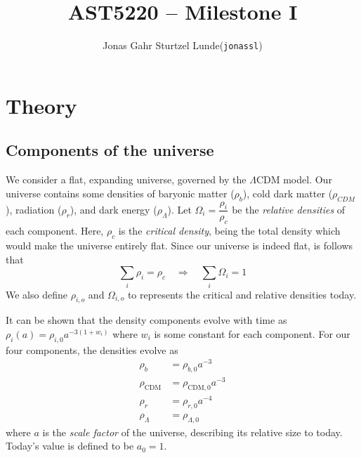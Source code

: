 \documentclass[10pt, a4paper]{article}
\begin{document}
\title{AST5220 -- Milestone I}
\author{
    \begin{tabular}{r l}
        Jonas Gahr Sturtzel Lunde & (\texttt{jonassl})
    \end{tabular}}

\maketitle
\vspace{2cm}

\section{Theory}
\subsection{Components of the universe}
We consider a flat, expanding universe, governed by the $\Lambda \text{CDM}$ model. Our universe contains some densities of baryonic matter ($\rho_b$), cold dark matter ($\rho_{CDM}$), radiation ($\rho_r$), and dark energy ($\rho_\Lambda$). Let $\Omega_i = \dfrac{\rho_i}{\rho_c}$ be the \textit{relative densities} of each component. Here, $\rho_c$ is the \textit{critical density}, being the total density which would make the universe entirely flat. Since our universe is indeed flat, is follows that
\begin{equation}\label{eqn:sum1}
    \sum_i \rho_i = \rho_c \quad \Rightarrow \quad \sum_i \Omega_i = 1
\end{equation}
We also define $\rho_{i,o}$ and $\Omega_{i,o}$ to represents the critical and relative densities today.

It can be shown \cite{ModernCosmology2003} that the density components evolve with time as $\rho_i(a) = \rho_{i,0}a^{-3(1+w_i)}$ where $w_i$ is some constant for each component. For our four components, the densities evolve as
\begin{align*}
    \rho_b &= \rho_{b,0} a^{-3} \\
    \rho_\text{CDM} &= \rho_{\text{CDM},0} a^{-3} \\
    \rho_r &= \rho_{r,0} a^{-4} \\
    \rho_\Lambda &= \rho_{\Lambda,0}
\end{align*}
where $a$ is the \textit{scale factor} of the universe, describing its relative size to today. Today's value is defined to be $a_0 = 1$.
\end{document}
